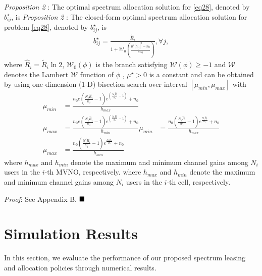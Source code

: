 \documentclass[journal]{IEEEtran}
\begin{document}
\begin{IEEEkeywords}
\textit{Proposition 2} : The optimal spectrum allocation solution for \eqref{eq28}, denoted by $b_{ij}^\star$, is
\textit{Proposition 2} : The closed-form optimal spectrum allocation solution for problem \eqref{eq28}, denoted by $b_{ij}^\star$, is
\begin{align}
b_{ij}^\star = \frac{\hat{R}_i}{1 + \mathcal{W}_0\left(\frac{\mu^{\star}\left|h_{ij}\right|^2 - n_0}{en_0}\right)}, \forall j,
\end{align}
where $\hat{R}_i = \tilde{R}_i\ln2$, $\mathcal{W}_0\left(\phi\right)$ is the branch satisfying $\mathcal{W}\left(\phi\right) \geq -1$ and $\mathcal{W}$ denotes the Lambert $\mathcal{W}$ function of $\phi$ \cite{RMCorless}, $\mu^{\star} > 0$ is a constant and can be obtained by using one-dimension (1-D) bisection search over interval $\left[\mu_{min}, \mu_{max}\right]$ with
\begin{align}
\mu_{min} &= \frac{n_0e\left(\frac{N_i\hat{R}_i}{w_i} - 1\right)e^{\left(\frac{N_i\hat{R}_i}{w_i} - 1\right)} + n_0}{h_{max}}  \\
\mu_{max} & = \frac{n_0e\left(\frac{N_i\hat{R}_i}{w_i} - 1\right)e^{\left(\frac{N_i\hat{R}_i}{w_i} - 1\right)} + n_0}{h_{min}}
\mu_{min} &= \frac{n_0\left(\frac{N_i\hat{R}_i}{w_i} - 1\right)e^{\frac{N_i\hat{R}_i}{w_i}} + n_0}{h_{max}}  \\
\mu_{max} & = \frac{n_0\left(\frac{N_i\hat{R}_i}{w_i} - 1\right)e^{\frac{N_i\hat{R}_i}{w_i}} + n_0}{h_{min}}
\end{align}
where $h_{max}$ and $h_{min}$ denote the maximum and minimum channel gains among $N_i$ users in the $i$-th MVNO, respectively.
where $h_{max}$ and $h_{min}$ denote the maximum and minimum channel gains among $N_i$ users in the $i$-th cell, respectively.

\textit{Proof}: See Appendix B.  $\hfill\blacksquare$
\section{Simulation Results}
In this section, we evaluate the performance of our proposed spectrum leasing and allocation policies through numerical results. 


\end{IEEEkeywords}
\end{document}
